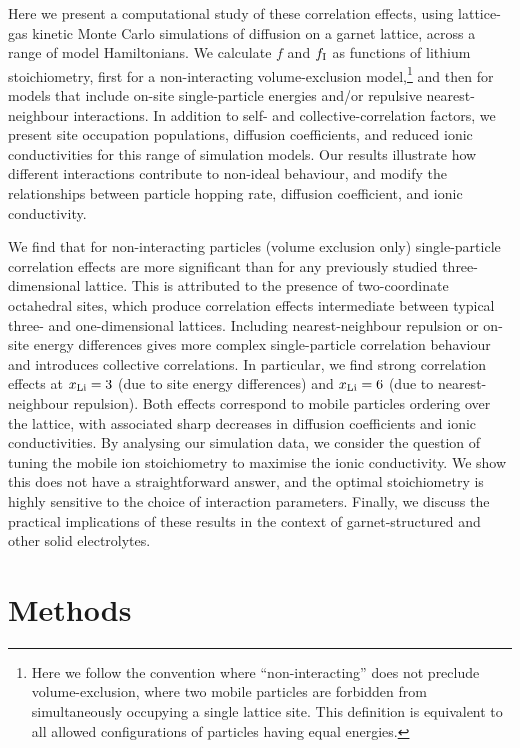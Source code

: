 \documentclass[aps,prb,twocolumn,superscriptaddress,reprint]{revtex4-1}
\newcommand{\xLi}{x_\m{Li}}
\begin{document}
Here we present a computational study of these correlation effects, using lattice-gas kinetic Monte Carlo simulations of diffusion on a garnet lattice, across a range of model Hamiltonians. 
We calculate $f$ and $f_{\mathrm{I}}$ as functions of lithium stoichiometry, first for a non-interacting volume-exclusion model,\footnote{Here we follow the convention where ``non-interacting'' does not preclude volume-exclusion, where two mobile particles are forbidden from simultaneously occupying a single lattice site.\cite{Kutner_PhysLett1981} This definition is equivalent to all allowed configurations of particles having equal energies.} and then for models that include on-site single-particle energies and/or repulsive nearest-neighbour interactions. 
In addition to self- and collective-correlation factors, we present site occupation populations, diffusion coefficients, and reduced ionic conductivities for this range of simulation models. Our results illustrate how different interactions contribute to non-ideal behaviour, and modify the relationships between particle hopping rate, diffusion coefficient, and ionic conductivity. 

We find that for non-interacting particles (volume exclusion only) single-particle correlation effects are more significant than for any previously studied three-dimensional lattice. This is attributed to the presence of two-coordinate octahedral sites, which produce correlation effects intermediate between typical three- and one-dimensional lattices. Including nearest-neighbour repulsion or on-site energy differences gives more complex single-particle correlation behaviour and introduces collective correlations. In particular, we find strong correlation effects at $\xLi=3$ (due to site energy differences) and $\xLi=6$ (due to nearest-neighbour repulsion). Both effects correspond to mobile particles ordering over the lattice, with associated sharp decreases in diffusion coefficients and ionic conductivities. By analysing our simulation data, we consider the question of tuning the mobile ion stoichiometry to maximise the ionic conductivity. We show this does not have a straightforward answer, and the optimal stoichiometry is highly sensitive to the choice of interaction parameters. Finally, we discuss the practical implications of these results in the context of garnet-structured and other solid electrolytes.

\section{Methods}
\end{document}
